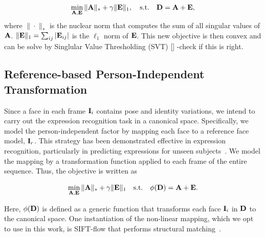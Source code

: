 \documentclass[journal]{IEEEtran}
\begin{document}
\begin{equation}
\min_{{\bf A},{\bf E}} \|{\bf A}\|_*+\gamma \|{\bf E}\|_1,  \quad \text{s.t.} \quad {\bf D} = {\bf A} + {\bf E}, 
\end{equation}
where $\|\cdot\|_*$ is the nuclear norm that computes the sum of all singular values of ${\bf A}$. $\|{\bf E}\|_1=\sum_{ij}|{\bf E}_{ij}|$ is the $\ell_1$ norm of ${\bf E}$. This new objective is then convex and can be solve by \textcolor[rgb]{1,0,0}{Singlular Value Thresholding (SVT) [] -check if this is right}. 


\subsection{Reference-based Person-Independent Transformation} 

Since a face in each frame ${\bf I}_i$ contains pose and identity variations, we intend to carry out the expression recognition task in a canonical space. Specifically, we model the person-independent factor by mapping each face to a reference face model, ${\bf I}_r$. This strategy has been demonstrated effective in expression recognition, particularly in predicting expressions for unseen subjects~\cite{Yang_SMCB12,Dahmane_TMM14}. We model the mapping by a transformation function applied to each frame of the entire sequence. Thus, the objective is written as

\begin{equation}
\min_{{\bf A},{\bf E}} \|{\bf A}\|_*+\gamma \|{\bf E}\|_1  \quad \text{s.t.} \quad \phi ({\bf D}) = {\bf A} + {\bf E}. 
\end{equation}

Here, $\phi ({\bf D})$ is defined as a generic function that transforms each face ${\bf I}_i$ in ${\bf D}$ to the canonical space. One instantiation of the non-linear mapping, which we opt to use in this work, is SIFT-flow that performs structural matching~\cite{Liu_PAMI11}. 
\end{document}
